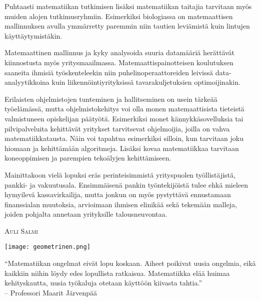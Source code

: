 \documentclass[../ala_hataile.tex]{subfiles}
\begin{document}
	Puhtaasti matematiikan tutkimisen lisäksi matematiikan taitajia tarvitaan myös muiden alojen tutkimusryhmiin. Esimerkiksi biologiassa on matemaattisen mallinnuksen avulla ymmärretty paremmin niin tautien leviämistä kuin lintujen käyttäytymistäkin. 
	
	Matemaattinen mallinnus ja kyky analysoida suuria data\-määriä herättävät kiinnostusta myös yritys\-maailmassa. Matemaattis\-painotteisen koulutuksen saaneita ihmisiä työskenteleekin niin puhelin\-operaattoreiden leivissä data-analyytikkoina kuin liikennöinti\-yrityksissä tavara\-kuljetuksien optimoijinakin.  
	
	Erilaisten ohjelmistojen tunteminen ja hallitseminen on usein tärkeää työelämässä, mutta ohjelmisto\-kehitys voi olla monen matemaattisista tieteistä valmistuneen opiskelijan päätyötä. Esimerkiksi monet kännykkä\-sovelluksia tai pilvi\-palveluita kehittävät yritykset tarvitsevat ohjelmoijia, joilla on vahva matematiikkatausta. Näin voi tapahtua esimerkiksi silloin, kun tarvitaan joku hiomaan ja kehittämään algoritmeja. Lisäksi kovaa matematiikkaa tarvitaan kone\-oppimisen ja parempien teko\-älyjen kehittämiseen. 
	
	Mainittakoon vielä lopuksi eräs pe\-rin\-tei\-sim\-mis\-tä yritys\-puolen työllistäjistä, pankki- ja vakuutus\-ala. Ensimmäisenä pankin työn\-tekijöistä tulee ehkä mieleen hymyilevä kassa\-virkailija, mutta jonkun on myös pystyttävä ennustamaan finanssi\-alan muutoksia, arvioimaan ihmisen elin\-ikää sekä tekemään malleja, joiden pohjalta annetaan yrityksille talous\-neuvontaa.
	
	\vspace{0.5cm}
	\noindent\textsc{Auli Salmi}
	
	\begin{figure*}[!b]
		\centering
		\texttt{[image: geometrinen.png]}
	\end{figure*}
	
	\begin{figure*}
		``Matematiikan ongelmat eivät lopu koskaan. Aiheet poikivat
		uusia ongelmia, eikä kaikkiin niihin löydy edes lopullista
		ratkaisua. Matematiikka elää huimaa kehityskautta,
		uusia työkaluja otetaan käyttöön kiivasta tahtia.''\\
		-- Professori Maarit Järvenpää
	\end{figure*}
	
	
\end{document}
